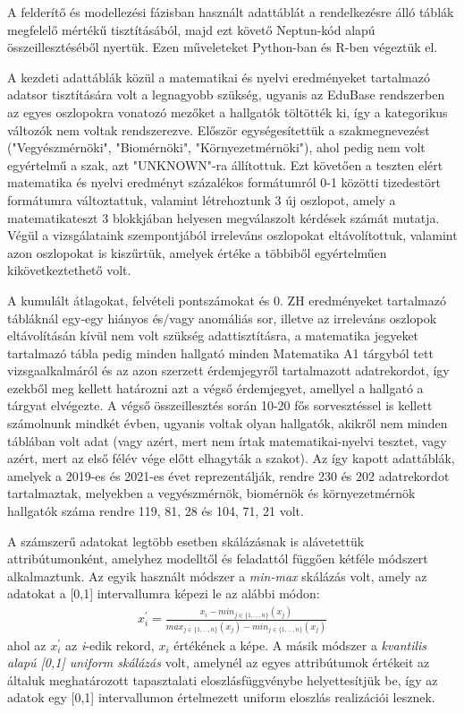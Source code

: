 \documentclass[12pt]{article}
\begin{document}
A felderítő és modellezési fázisban használt adattáblát a rendelkezésre álló táblák megfelelő mértékű tisztításából, majd ezt követő Neptun-kód alapú összeillesztéséből nyertük. Ezen műveleteket Python-ban és R-ben végeztük el.

A kezdeti adattáblák közül a matematikai és nyelvi eredményeket tartalmazó adatsor tisztítására volt a legnagyobb szükség, ugyanis az EduBase rendszerben az egyes oszlopokra vonatozó mezőket a hallgatók töltötték ki, így a kategorikus változók nem voltak rendszerezve. Először egységesítettük a szakmegnevezést ("Vegyészmérnöki", "Biomérnöki", "Környezetmérnöki"), ahol pedig nem volt egyértelmű a szak, azt "UNKNOWN"-ra állítottuk. Ezt követően a teszten elért matematika és nyelvi eredményt százalékos formátumról 0-1 közötti tizedestört formátumra változtattuk, valamint létrehoztunk 3 új oszlopot, amely a matematikateszt 3 blokkjában helyesen megválaszolt kérdések számát mutatja. Végül a vizsgálataink szempontjából irreleváns oszlopokat eltávolítottuk, valamint azon oszlopokat is kiszűrtük, amelyek értéke a többiből egyértelműen kikövetkeztethető volt. 

A kumulált átlagokat, felvételi pontszámokat és 0. ZH eredményeket tartalmazó tábláknál egy-egy hiányos és/vagy anomáliás sor, illetve az irreleváns oszlopok eltávolításán kívül nem volt szükség adattisztításra, a matematika jegyeket tartalmazó tábla pedig minden hallgató minden Matematika A1 tárgyból tett vizsgaalkalmáról és az azon szerzett érdemjegyről tartalmazott adatrekordot, így ezekből meg kellett határozni azt a végső érdemjegyet, amellyel a hallgató a tárgyat elvégezte. A végső összeillesztés során 10-20 fős sorvesztéssel is kellett számolnunk mindkét évben, ugyanis voltak olyan hallgatók, akikről nem minden táblában volt adat (vagy azért, mert nem írtak matematikai-nyelvi tesztet, vagy azért, mert az első félév vége előtt elhagyták a szakot). Az így kapott adattáblák, amelyek a 2019-es és 2021-es évet reprezentálják, rendre 230 és 202 adatrekordot tartalmaztak, melyekben a vegyészmérnök, biomérnök és környezetmérnök hallgatók száma rendre 119, 81, 28 és 104, 71, 21 volt.

A számszerű adatokat legtöbb esetben skálázásnak is alávetettük attribútumonként, amelyhez modelltől és feladattól függően kétféle módszert alkalmaztunk. Az egyik használt módszer a \emph{min-max} skálázás volt, amely az adatokat a [0,1] intervallumra képezi le az alábbi módon:\\
\begin{align}
x_{i}^{'} = \frac{x_{i}-min_{j \in \{1,\dots,n\}}(x_{j})}{max_{j \in \{1,\dots,n\}}(x_{j})-min_{j \in \{1,\dots,n\}}(x_{j})}
\end{align}
ahol az $x_{i}^{'}$ az \emph{i}-edik rekord, $x_i$ értékének a képe. A másik módszer a \emph{kvantilis alapú [0,1] uniform skálázás} volt, amelynél az egyes attribútumok értékeit az általuk meghatározott tapasztalati eloszlásfüggvénybe helyettesítjük be, így az adatok egy [0,1] intervallumon értelmezett uniform eloszlás realizációi lesznek.
\end{document}

